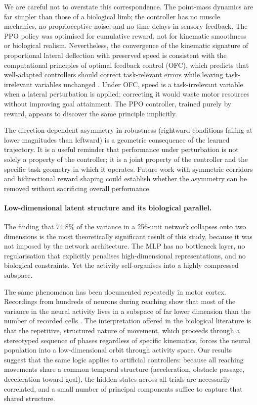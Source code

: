 \documentclass{article}
\newcommand{\PCAVarTotal}{74.8\%}
\begin{document}
We are careful not to overstate this correspondence.
The point-mass dynamics are far simpler than those of a biological limb;
the controller has no muscle mechanics, no proprioceptive noise, and no
time delays in sensory feedback.
The PPO policy was optimised for cumulative reward, not for kinematic
smoothness or biological realism.
Nevertheless, the convergence of the kinematic signature of proportional
lateral deflection with preserved speed is consistent with the computational
principles of optimal feedback control (OFC), which predicts that
well-adapted controllers should correct task-relevant errors while
leaving task-irrelevant variables unchanged \citep{Todorov2002,Todorov2009,Franklin2011,WolpertGhahramani2000}.
Under OFC, speed is a task-irrelevant variable when a lateral perturbation
is applied; correcting it would waste motor resources without improving
goal attainment.
The PPO controller, trained purely by reward, appears to discover the same
principle implicitly.

The direction-dependent asymmetry in robustness (rightward conditions
failing at lower magnitudes than leftward) is a geometric consequence of
the learned trajectory.
It is a useful reminder that performance under perturbation is not solely
a property of the controller; it is a joint property of the controller and
the specific task geometry in which it operates.
Future work with symmetric corridors and bidirectional reward shaping
could establish whether the asymmetry can be removed without sacrificing
overall performance.

\paragraph{Low-dimensional latent structure and its biological parallel.}

The finding that \PCAVarTotal{} of the variance in a 256-unit network
collapses onto two dimensions is the most theoretically significant result
of this study, because it was not imposed by the network architecture.
The MLP has no bottleneck layer, no regularisation that explicitly
penalises high-dimensional representations, and no biological constraints.
Yet the activity self-organises into a highly compressed subspace.

The same phenomenon has been documented repeatedly in motor cortex.
Recordings from hundreds of neurons during reaching show that most of the
variance in the neural activity lives in a subspace of far lower dimension
than the number of recorded cells
\citep{Churchland2012,Shenoy2013,Cunningham2014,Gallego2017}.
The interpretation offered in the biological literature is that the
repetitive, structured nature of movement, which proceeds through a
stereotyped sequence of phases regardless of specific kinematics, forces
the neural population into a low-dimensional orbit through activity space.
Our results suggest that the same logic applies to artificial controllers:
because all reaching movements share a common temporal structure
(acceleration, obstacle passage, deceleration toward goal), the hidden
states across all trials are necessarily correlated, and a small number
of principal components suffice to capture that shared structure.
\end{document}
